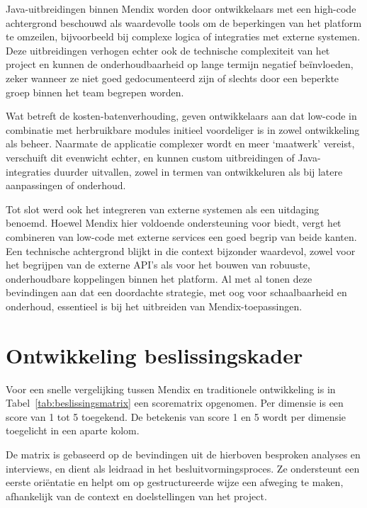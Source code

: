 Java-uitbreidingen binnen Mendix worden door ontwikkelaars met een high-code achtergrond beschouwd als waardevolle tools om de beperkingen van het platform te omzeilen, bijvoorbeeld bij complexe logica of integraties met externe systemen. Deze uitbreidingen verhogen echter ook de technische complexiteit van het project en kunnen de onderhoudbaarheid op lange termijn negatief beïnvloeden, zeker wanneer ze niet goed gedocumenteerd zijn of slechts door een beperkte groep binnen het team begrepen worden.

Wat betreft de kosten-batenverhouding, geven ontwikkelaars aan dat low-code in combinatie met herbruikbare modules initieel voordeliger is in zowel ontwikkeling als beheer. Naarmate de applicatie complexer wordt en meer ‘maatwerk’ vereist, verschuift dit evenwicht echter, en kunnen custom uitbreidingen of Java-integraties duurder uitvallen, zowel in termen van ontwikkeluren als bij latere aanpassingen of onderhoud.

Tot slot werd ook het integreren van externe systemen als een uitdaging benoemd. Hoewel Mendix hier voldoende ondersteuning voor biedt, vergt het combineren van low-code met externe services een goed begrip van beide kanten. Een technische achtergrond blijkt in die context bijzonder waardevol, zowel voor het begrijpen van de externe API’s als voor het bouwen van robuuste, onderhoudbare koppelingen binnen het platform. Al met al tonen deze bevindingen aan dat een doordachte strategie, met oog voor schaalbaarheid en onderhoud, essentieel is bij het uitbreiden van Mendix-toepassingen.

\section{Ontwikkeling beslissingskader}
Voor een snelle vergelijking tussen Mendix en traditionele ontwikkeling is in Tabel~\ref{tab:beslissingsmatrix} een scorematrix opgenomen. Per dimensie is een score van 1 tot 5 toegekend. De betekenis van score 1 en 5 wordt per dimensie toegelicht in een aparte kolom. 

De matrix is gebaseerd op de bevindingen uit de hierboven besproken analyses en interviews, en dient als leidraad in het besluitvormingsproces. Ze ondersteunt een eerste oriëntatie en helpt om op gestructureerde wijze een afweging te maken, afhankelijk van de context en doelstellingen van het project.

